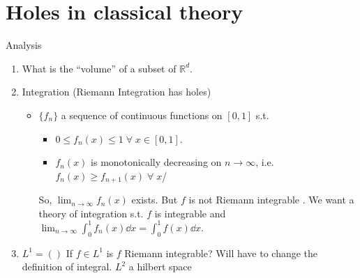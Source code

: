 
\def\npart {II}
\def\nterm {Michaelmas}
\def\nyear {2023}
\def\nlecturer {Dr Sarkar}
\def\ncourse {Probability and Measure}


\usepackage{relsize}

\newcommand{\symmdiff}{\mathrel{\raisebox{1pt}{$\mathsmaller\triangle$}}}
\newcommand{\prob}[1]{\mathbb{P}\left({#1}\right)}
\let \emptyset \varnothing
\newcommand{\expect}[1]{\mathbb{E}\left[{#1}\right]}
\DeclarePairedDelimiter\floor{\lfloor}{\rfloor}

% 

\setcounter{section}{-1}


    \maketitle
    \tableofcontents

    \section{Holes in classical theory}

    Analysis

    \begin{enumerate}
        \item What is the ``volume'' of a subset of $\mathbb{R}^d$.
        \item Integration (Riemann Integration has holes)
        \begin{itemize}
            \item $\{f_n\}$ a sequence of continuous functions on $[0, 1]$ s.t.
            \begin{itemize}
                \item $0 \leq f_n(x) \leq 1 \; \forall \; x \in [0, 1]$.
                \item $f_n(x)$ is monotonically decreasing on $n \to \infty$, i.e. $f_n(x) \geq f_{n+1}(x) \; \forall \; x$/
            \end{itemize}
            So, $\lim_{n \to \infty} f_n(x)$ exists. But $f$ is not Riemann integrable . We want a theory of integration s.t. $f$ is integrable and $\lim_{n \to \infty} \int_{0}^{1} f_n(x) \dd{x} = \int_{0}^{1} f(x) \dd{x}$.
        \end{itemize}
        \item $L^1 = ()$
        If $f \in L^1$ is $f$ Riemann integrable? Will have to change the definition of integral. $L^2$ a hilbert space
    \end{enumerate}

